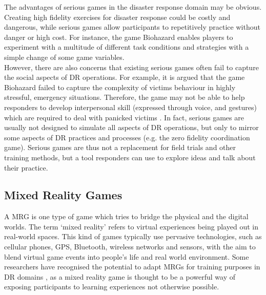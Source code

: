 The advantages of serious games in the disaster response domain may be obvious. Creating high fidelity exercises for disaster response could be costly and dangerous, while serious games allow participants to repetitively practice without danger or high cost. For instance, the game Biohazard \citep{Susi2007} enables players to experiment with a multitude of different task conditions and strategies with a simple change of some game variables.\\

However, there are also concerns that existing serious games often fail to capture the social aspects of \ac{DR} operations. For example, it is argued that the game Biohazard failed to capture the complexity of victims behaviour in highly stressful, emergency situations. Therefore, the game may not be able to help responders to develop interpersonal skill (expressed through voice, and gestures) which are required to deal with panicked victims \citep{Susi2007}. In fact, serious games are usually not designed to simulate all aspects of \ac{DR} operations, but only to mirror some aspects of \ac{DR} practices and processes (e.g. the zero fidelity coordination game). Serious games are thus not a replacement for field trials and other training methods, but a tool responders can use to explore ideas and talk about their practice.\\


\subsection{Mixed Reality Games}
A \acf{MRG} is one type of game which tries to bridge the physical and the digital \citep{Benford2005} worlds. The term `mixed reality' refers to virtual experiences being played out in real-world spaces. This kind of games typically use pervasive technologies, such as cellular phones, GPS, Bluetooth, wireless networks and sensors, with the aim to blend virtual game events into people's life and real world environment. Some researchers have recognised the potential to adapt \ac{MRG}s for training purposes in \ac{DR} domains \citep{Fischer2012}, as a mixed reality game is thought to be a powerful way of exposing participants to learning experiences not otherwise possible. \\

